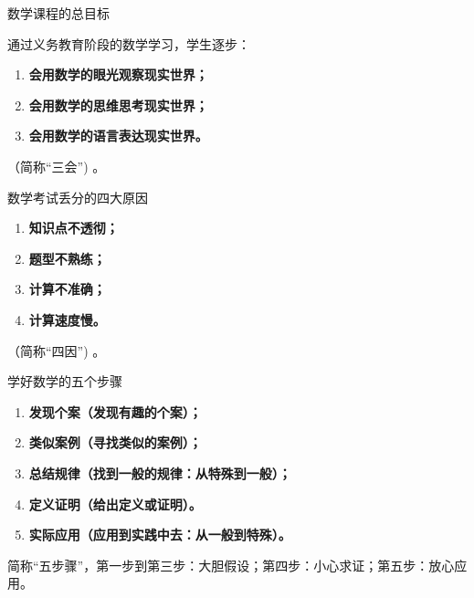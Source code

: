 \documentclass[aspectratio=169]{ctexbeamer} %
\date{\today}
\begin{document}
\begin{frame}[t]{数学课程的总目标}
\begin{spacing}{1.5} %
{\large
通过义务教育阶段的数学学习，学生逐步：\\
\begin{enumerate}[label={\arabic*.}]
\item \textbf{会用数学的眼光观察现实世界；}
\item \textbf{会用数学的思维思考现实世界；}
\item \textbf{会用数学的语言表达现实世界。}
\end{enumerate}
（简称“三会”) 。\\
}
\end{spacing}
\end{frame}

\begin{frame}[t]{数学考试丢分的四大原因}
\begin{spacing}{1.5} %
{\large
\begin{enumerate}[label={\arabic*.}]
\item \textbf{知识点不透彻；}
\item \textbf{题型不熟练；}
\item \textbf{计算不准确；}
\item \textbf{计算速度慢。} 
\end{enumerate}
（简称“四因”) 。\\
}
\end{spacing}
\end{frame}

\begin{frame}[t]{学好数学的五个步骤}
\begin{spacing}{1.5} %
{\large
\begin{enumerate}[label={\arabic*.}]
\item \textbf{发现个案（发现有趣的个案）；}
\item \textbf{类似案例（寻找类似的案例）；}
\item \textbf{总结规律（找到一般的规律：从特殊到一般）；}
\item \textbf{定义证明（给出定义或证明）。} 
\item \textbf{实际应用（应用到实践中去：从一般到特殊）。} 
\end{enumerate}
\vspace{12pt}
简称“五步骤”，\alert{第一步到第三步：大胆假设；第四步：小心求证；第五步：放心应用。}
}
\end{spacing}
\end{frame}
\end{document}
